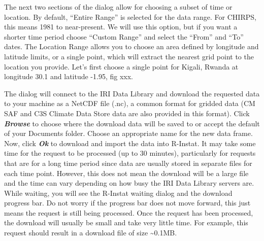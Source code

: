 \documentclass[
  letterpaper,
  DIV=11,
  numbers=noendperiod]{scrreprt}
\begin{document}
The next two sections of the dialog allow for choosing a subset of time
or location. By default, ``Entire Range'' is selected for the data
range. For CHIRPS, this means 1981 to near-present. We will use this
option, but if you want a shorter time period choose ``Custom Range''
and select the ``From'' and ``To'' dates. The Location Range allows you
to choose an area defined by longitude and latitude limits, or a single
point, which will extract the nearest grid point to the location you
provide. Let's first choose a single point for Kigali, Rwanda at
longitude 30.1 and latitude -1.95, fig xxx.

The dialog will connect to the IRI Data Library and download the
requested data to your machine as a NetCDF file (.nc), a common format
for gridded data (CM SAF and C3S Climate Data Store data are also
provided in this format). Click \textbf{\emph{Browse}} to choose where
the download data will be saved to or accept the default of your
Documents folder. Choose an appropriate name for the new data frame.
Now, click \textbf{\emph{Ok}} to download and import the data into
R-Instat. It may take some time for the request to be processed (up to
30 minutes), particularly for requests that are for a long time period
since data are usually stored in separate files for each time point.
However, this does not mean the download will be a large file and the
time can vary depending on how busy the IRI Data Library servers are.
While waiting, you will see the R-Instat waiting dialog and the download
progress bar. Do not worry if the progress bar does not move forward,
this just means the request is still being processed. Once the request
has been processed, the download will usually be small and take very
little time. For example, this request should result in a download file
of size \textasciitilde0.1MB.
\end{document}

